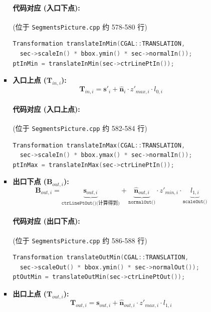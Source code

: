 \documentclass{ctexart}
\begin{document}
\begin{itemize}
\begin{enumerate}
\begin{itemize}
                    \paragraph{代码对应 (入口下点):} (位于 \texttt{SegmentsPicture.cpp} 约 578-580 行)
                    \begin{lstlisting}[language=C++]
Transformation translateInMin(CGAL::TRANSLATION,
  sec->scaleIn() * bbox.ymin() * sec->normalIn());
ptInMin = translateInMin(sec->ctrLinePtIn());
                    \end{lstlisting}
                    \item \textbf{入口上点 (\( \mathbf{T}_{in,i} \)):}
                    \[ \mathbf{T}_{in,i} = {\mathbf{s}'}_i + \hat{\mathbf{n}}_i \cdot z'_{max,i} \cdot l_{0,i} \]
                    \paragraph{代码对应 (入口上点):} (位于 \texttt{SegmentsPicture.cpp} 约 582-584 行)
                    \begin{lstlisting}[language=C++]
Transformation translateInMax(CGAL::TRANSLATION,
  sec->scaleIn() * bbox.ymax() * sec->normalIn());
ptInMax = translateInMax(sec->ctrLinePtIn());
                    \end{lstlisting}
                    \item \textbf{出口下点 (\( \mathbf{B}_{out,i} \)):}
                    \[ \mathbf{B}_{out,i} = \underbrace{\mathbf{s}_{out,i}}_{\texttt{ctrLinePtOut()} \text{(计算得到)}} + \underbrace{\hat{\mathbf{n}}_{out,i}}_{\texttt{normalOut()}} \cdot z'_{min,i} \cdot \underbrace{l_{1,i}}_{\texttt{scaleOut()}} \]
                    \paragraph{代码对应 (出口下点):} (位于 \texttt{SegmentsPicture.cpp} 约 586-588 行)
                    \begin{lstlisting}[language=C++]
Transformation translateOutMin(CGAL::TRANSLATION,
  sec->scaleOut() * bbox.ymin() * sec->normalOut());
ptOutMin = translateOutMin(sec->ctrLinePtOut());
                    \end{lstlisting}
                    \item \textbf{出口上点 (\( \mathbf{T}_{out,i} \)):}
                    \[ \mathbf{T}_{out,i} = \mathbf{s}_{out,i} + \hat{\mathbf{n}}_{out,i} \cdot z'_{max,i} \cdot l_{1,i} \]

\end{itemize}
\end{enumerate}
\end{itemize}
\end{document}
